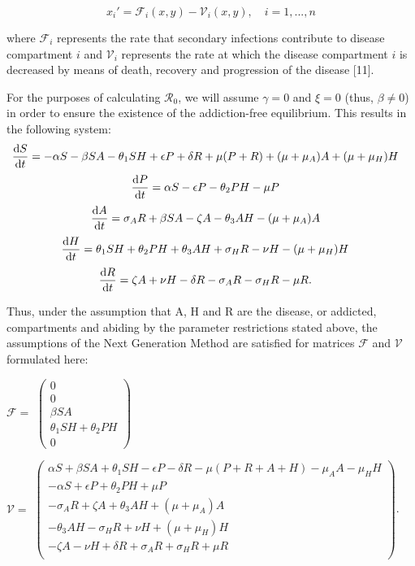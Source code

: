 \documentclass[12pt]{article}
\begin{document}
\[{x_i'} = \mathscr{F}_{i} (x,y)-\mathscr{V}_i (x,y),\quad i=1,...,n\] 

where $\mathscr{F}_{i}$ represents the rate that secondary infections contribute to disease compartment $i$ and $\mathscr{V}_{i}$ represents the rate at which the disease compartment $i$ is decreased by means of death, recovery and progression of the disease [11]. 



For the purposes of calculating $\mathscr{R}_0$, we will assume $\gamma =0$ and $\xi =0$ (thus, $\beta \neq 0$) in order to ensure the existence of the addiction-free equilibrium. This results in the following system:
\[\dv{S}{t} = -\alpha S - \beta SA  - \theta_{1} SH +\epsilon P +\delta R +\mu (P+R) + (\mu+\mu_{A})A + (\mu+\mu_{H}) H \quad \] 
\[\dv{P}{t} = \alpha S - \epsilon P  - \theta_{2}PH- \mu P    \quad\]
\[\dv{A}{t} = \sigma_{A} R +\beta SA  -\zeta A - \theta_{3}AH-(\mu + \mu_{A})A   \quad\]
\[\dv{H}{t} = \theta_{1}SH+\theta_{2}PH+\theta_{3}AH + \sigma_{H}R-\nu H-(\mu+\mu_{H})H  \quad\]
\[\dv{R}{t} = \zeta A +\nu H -\delta R -\sigma_{A}R-\sigma_{H}R -\mu R.\quad\]

Thus, under the assumption that A, H and R are the disease, or addicted, compartments and abiding by the parameter restrictions stated above, the assumptions of the Next Generation Method are satisfied for matrices $\mathscr{F}$ and $\mathscr{V}$ formulated here:

\begin{center}
$\mathscr{F}=$
$ \begin{pmatrix}

0 \\
0 \\
\beta SA \\
\theta_{1}SH+\theta_{2}PH \\
0
\end{pmatrix}$



$\mathscr{V}=$
$ \begin{pmatrix}

\alpha S + \beta SA+\theta_{1}SH-\epsilon P-\delta R-\mu(P+R+A+H)-\mu_{A}A-\mu_{H}H \\
-\alpha S+\epsilon P +\theta_{2}PH +\mu P \\
-\sigma_{A}R+\zeta A+\theta_{3} AH + (\mu +\mu_{A})A \\
-\theta_{3}AH-\sigma_{H}R+\nu H +(\mu +\mu_{H}) H \\
-\zeta A -\nu H +\delta R +\sigma_{A}R +\sigma_{H}R +\mu R\\
\end{pmatrix}$.
\end{center}
\end{document}

